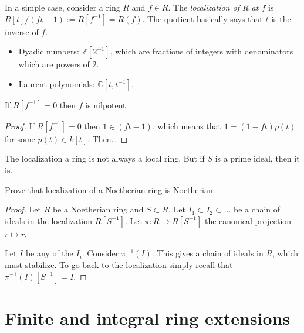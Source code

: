 \noindent
In a simple case, consider a ring $R$ and $f \in R$.
The {\it localization of $R$ at $f$}
is $R[t]/(ft-1):=R[f^{-1}]=R(f)$. 
The quotient basically says that $t$ is the inverse of $f$.

\begin{example}
\label{example-localization}
\begin{itemize}
\item Dyadic numbers: $\mathbb{Z}[2^{-1}]$,
which are fractions of integers with denominators which
are powers of $2$.

\item Laurent polynomials: $\mathbb{C}[t,t^{-1}]$.
\end{itemize}
\end{example}

\begin{lemma}
\label{lemma-localization-nilpotent}
If $R[f^{-1}]=0$ then $f$ is nilpotent.
\end{lemma}

\begin{proof}
If $R[f^{-1}]=0$ then $1 \in (ft-1)$,
which means that $1=(1-ft)p(t)$ for some $p(t) \in k[t]$.
Then…
\end{proof}

\noindent
The localization a ring is not always a local ring.
But if $S$ is a prime ideal, then it is.


\begin{exercise}
\label{exercise-localization-of-noetherian-is-noetherian}
Prove that localization of a Noetherian ring is Noetherian.
\end{exercise}

\begin{proof}
Let $R$ be a Noetherian ring and $S \subset R$.
Let $I_1\subset I_2 \subset…$
be a chain of ideals in the localization $R[S^{-1}]$.
Let $\pi:R \to R[S^{-1}]$ the canonical projection $r \mapsto r$.

Let $I$ be any of the $I_i$.
Consider $\pi^{-1}(I)$. This gives a chain of ideals in $R$,
which must stabilize.
To go back to the localization simply recall that
$\pi^{-1}(I)[S^{-1}]=I$.
\end{proof}





\section{Finite and integral ring extensions}
\label{section-finite-ring-extensions}

